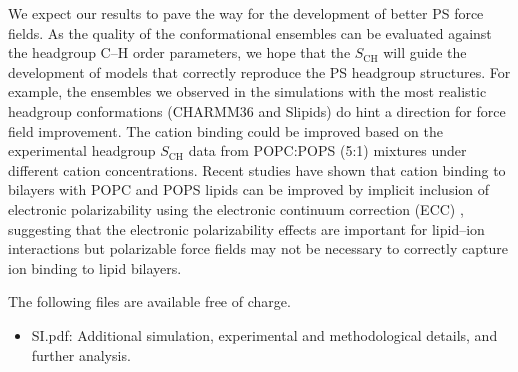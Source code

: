 \documentclass[journal=jpcbfk,manuscript=article]{achemso}
\begin{document}
We expect our results to pave the way for the development of better PS force fields.
As the quality of the conformational ensembles can be evaluated
against the headgroup C--H order parameters, we hope that the $S_\mathrm{CH}$ will guide the development of
models that correctly reproduce the PS headgroup structures. For example, the ensembles we observed in the simulations
with the most realistic headgroup conformations (CHARMM36 and Slipids) do hint a direction for force
field improvement. The cation binding could be improved based on the experimental headgroup $S_\mathrm{CH}$
data from POPC:POPS (5:1) mixtures under different cation concentrations. Recent studies have shown that 
cation binding to bilayers with POPC and POPS lipids can be improved by implicit inclusion of electronic
polarizability using the electronic continuum correction (ECC) \cite{melcr18,ECCpops}, suggesting that
the electronic polarizability effects are important for lipid--ion interactions but polarizable force fields
may not be necessary to correctly capture ion binding to lipid bilayers.

\begin{suppinfo} 
 
 
The following files are available free of charge. 
\begin{itemize} 
  \item SI.pdf: Additional simulation, experimental and methodological details, and further analysis. 
\end{itemize} 
 
\end{suppinfo} 
\end{document}
